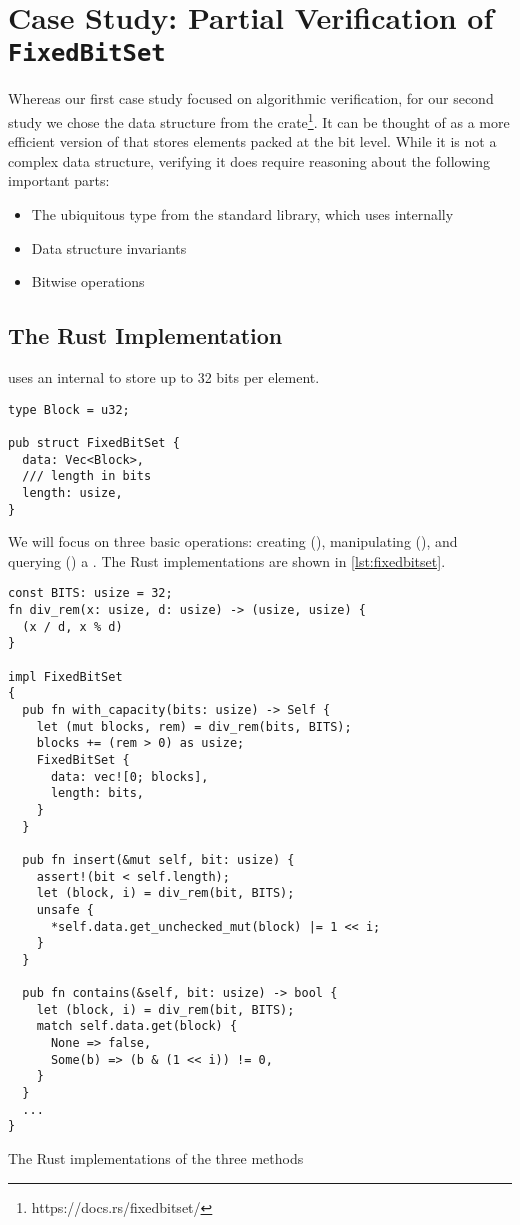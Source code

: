 \section{Case Study: Partial Verification of \texttt{FixedBitSet}}
\label{sec:fixedbitset}

Whereas our first case study focused on algorithmic verification, for our second
study we chose the  data structure from the 
crate\footnote{https://docs.rs/fixedbitset/}. It can be thought of as
a more efficient version of  that stores elements packed at the bit
level. While it is not a complex data structure, verifying it does require
reasoning about the following important parts:

\begin{itemize}
  \item The ubiquitous  type from the standard library, which
     uses internally
  \item Data structure invariants
  \item Bitwise operations
\end{itemize}

\subsection{The Rust Implementation}

 uses an internal  to store up to 32 bits per element.

\begin{verbatim}
type Block = u32;

pub struct FixedBitSet {
  data: Vec<Block>,
  /// length in bits
  length: usize,
}
\end{verbatim}

We will focus on three basic operations: creating (),
manipulating (), and querying () a
. The Rust implementations are shown in \autoref{lst:fixedbitset}.

\begin{listing}[bt!]
\begin{verbatim}
const BITS: usize = 32;
fn div_rem(x: usize, d: usize) -> (usize, usize) {
  (x / d, x % d)
}

impl FixedBitSet
{
  pub fn with_capacity(bits: usize) -> Self {
    let (mut blocks, rem) = div_rem(bits, BITS);
    blocks += (rem > 0) as usize;
    FixedBitSet {
      data: vec![0; blocks],
      length: bits,
    }
  }

  pub fn insert(&mut self, bit: usize) {
    assert!(bit < self.length);
    let (block, i) = div_rem(bit, BITS);
    unsafe {
      *self.data.get_unchecked_mut(block) |= 1 << i;
    }
  }

  pub fn contains(&self, bit: usize) -> bool {
    let (block, i) = div_rem(bit, BITS);
    match self.data.get(block) {
      None => false,
      Some(b) => (b & (1 << i)) != 0,
    }
  }
  ...
}
\end{verbatim}

  \caption{The Rust implementations of the three methods}
  \label{lst:fixedbitset}
\end{listing}

